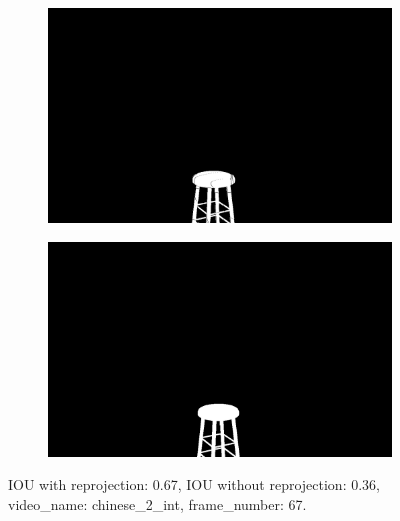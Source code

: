 \begin{figure}
\begin{subfigure}[t]{0.19\textwidth}
\end{subfigure}
\begin{subfigure}[t]{0.19\textwidth}
\centering
\includegraphics[scale=0.07]{good_examples/visual_76165_w_np.png}
\end{subfigure}
\begin{subfigure}[t]{0.19\textwidth}
\centering
\includegraphics[scale=0.07]{good_examples/visual_76165_wo_np.png}
\end{subfigure}
\caption{IOU with reprojection: 0.67, IOU without reprojection: 0.36, video\_name: chinese\_2\_int, frame\_number: 67.}
\end{figure}


